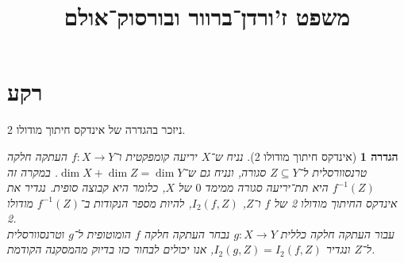 \documentclass[aspectratio=169,notheorems,mathserif]{beamer}
\title{משפט ז'ורדן־ברוור ובורסוק־אולם}
\author{}
\institute{טופולוגיה דיפרנציאלית --- 80576}
\date{}
\theoremstyle{c_plain}
\theoremstyle{c_definition}
\newtheorem{definition}[theorem]{הגדרה}
\theoremstyle{c_remark}
\newtheorem*{remark}{הערה}
\begin{document}
\frame{\titlepage}

\section{רקע}
\begin{frame}
	ניזכר בהגדרה של אינדקס חיתוך מודולו 2.
	\begin{definition}[אינדקס חיתוך מודולו 2]
		נניח ש־$X$ יריעה קומפקטית ו־$f : X \to Y$ העתקה חלקה טרנסוורסלית ל־$Z \subseteq Y$ סגורה, ונניח גם ש־$\dim X + \dim Z = \dim Y$.
		במקרה זה $f^{-1}(Z)$ היא תת־יריעה סגורה ממימד $0$ של $X$, כלומר היא קבוצה סופית.
		נגדיר את אינדקס החיתוך מודולו 2 של $f$ ו־$Z$, $I_2(f, Z)$, להיות מספר הנקודות ב־$f^{-1}(Z)$ מודולו 2. \\
		עבור העתקה חלקה כללית $g : X \to Y$ נבחר העתקה חלקה $f$ הומוטופית ל־$g$ וטרנסוורסלית ל־$Z$ ונגדיר $I_2(g, Z) = I_2(f, Z)$, אנו יכולים לבחור כזו בדיוק מהמסקנה הקודמת.
	\end{definition}
\end{frame}
\end{document}
